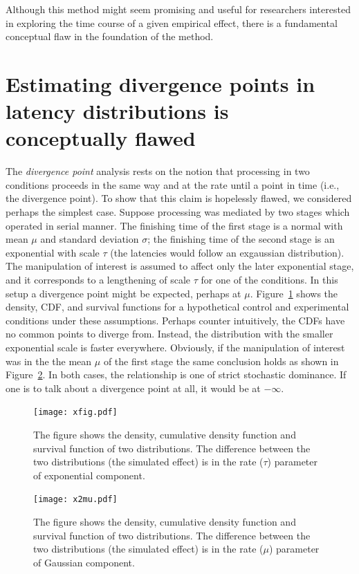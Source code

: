 \documentclass[man]{apa}%
\begin{document}
      Although this method might seem  promising and useful for researchers interested in exploring the time course of a given  empirical effect, there is a fundamental conceptual flaw in the foundation of the method.

\section{Estimating divergence points in latency distributions is conceptually flawed}

The \emph{divergence point} analysis rests on the notion that processing in two conditions proceeds in the same way and at the rate until a point in time  (i.e., the divergence point). To show that this claim is hopelessly flawed, we considered perhaps the simplest case.  Suppose processing was mediated by two stages which operated in serial manner.  The finishing time of the first stage is a normal with mean $\mu$ and standard deviation $\sigma$; the finishing time of the second stage is an exponential with scale $\tau$ (the latencies would follow an exgaussian distribution).  The manipulation of interest is assumed to affect only the later exponential stage, and it corresponds to a lengthening of scale $\tau$ for one of the conditions.   In this setup a divergence point might be expected, perhaps at $\mu$.  Figure~\ref{fig:x} shows the density, CDF, and survival functions for a hypothetical control and experimental conditions under these assumptions.  Perhaps counter intuitively, the CDFs have no common points to diverge from.  Instead, the distribution with the smaller exponential scale is faster everywhere. Obviously, if the manipulation of interest was in the the mean $\mu$ of the first stage the same conclusion holds as shown in Figure~\ref{fig:mu}. In both cases, the relationship is one of strict stochastic dominance.   If one is to talk about a divergence point at all, it would be at  $-\infty.$



\begin{figure}[h] %
	\texttt{[image: xfig.pdf]}
	\caption{The figure shows the density, cumulative density function and survival function of two distributions. The difference between the two distributions (the simulated effect) is in the rate ($\tau$) parameter of exponential component.}
		\label{fig:x}
\end{figure}



\begin{figure}[h] %
	\texttt{[image: x2mu.pdf]}
	\caption{The figure shows the density, cumulative density function and survival function of two distributions. The difference between the two distributions (the simulated effect) is in the rate ($\mu$) parameter of Gaussian component.}
		\label{fig:mu}
\end{figure}
\end{document}
